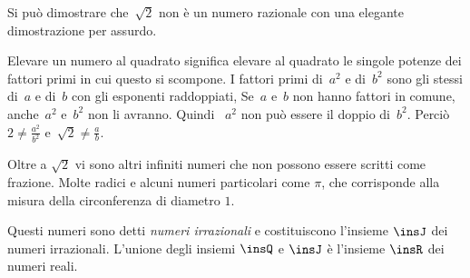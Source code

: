 Si può dimostrare che~\(\sqrt{2}\) non è un numero razionale con una elegante 
dimostrazione per assurdo. 


Elevare un numero al quadrato significa elevare al quadrato le
singole potenze dei fattori primi in cui questo si scompone. I fattori
primi di~\(a^{2}\) e di~\(b^{2}\) sono gli stessi di~\(a\) e di~\(b\) con
gli esponenti raddoppiati, Se~\(a\) e~\(b\) non hanno fattori in comune, 
anche~\(a^{2}\) e~\(b^{2}\) non li avranno. Quindi ~\(a^{2}\) non può essere il 
doppio di~\(b^{2}\).
Perciò~\(2\ne\frac{a^{2}}{b^{2}}\) e~\(\sqrt{2}\ne\frac{a}{b}\).

Oltre a \(\sqrt{2}\) vi sono altri infiniti numeri che non possono essere scritti 
come frazione. Molte radici e alcuni numeri particolari come \(\pi\), 
che corrisponde alla misura della circonferenza di diametro \(1\).

Questi numeri sono detti \emph{numeri irrazionali} e costituiscono l'insieme 
\(\insJ\) dei numeri irrazionali.
L'unione degli insiemi \(\insQ\) e \(\insJ\) è l'insieme \(\insR\) dei numeri reali.


